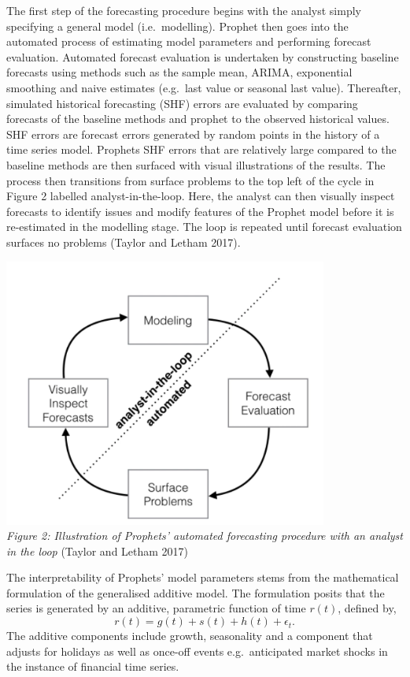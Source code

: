 \documentclass[12pt,a4paper]{article}
\numberwithin{equation}{section}
\numberwithin{figure}{section}
\numberwithin{table}{section}
\begin{document}
The first step of the forecasting procedure begins with the analyst
simply specifying a general model (i.e.~modelling). Prophet then goes
into the automated process of estimating model parameters and performing
forecast evaluation. Automated forecast evaluation is undertaken by
constructing baseline forecasts using methods such as the sample mean,
ARIMA, exponential smoothing and naive estimates (e.g.~last value or
seasonal last value). Thereafter, simulated historical forecasting (SHF)
errors are evaluated by comparing forecasts of the baseline methods and
prophet to the observed historical values. SHF errors are forecast
errors generated by random points in the history of a time series model.
Prophets SHF errors that are relatively large compared to the baseline
methods are then surfaced with visual illustrations of the results. The
process then transitions from surface problems to the top left of the
cycle in Figure 2 labelled analyst-in-the-loop. Here, the analyst can
then visually inspect forecasts to identify issues and modify features
of the Prophet model before it is re-estimated in the modelling stage.
The loop is repeated until forecast evaluation surfaces no problems
(Taylor and Letham 2017).

\includegraphics[width=0.80000\textwidth]{analyst in the loop.png}\\
\emph{Figure 2: Illustration of Prophets' automated forecasting
procedure with an analyst in the loop} (Taylor and Letham 2017)

The interpretability of Prophets' model parameters stems from the
mathematical formulation of the generalised additive model. The
formulation posits that the series is generated by an additive,
parametric function of time \(r(t)\), defined by,
\[ r(t) = g(t) + s(t) +  h(t) + \epsilon_t.\] The additive components
include growth, seasonality and a component that adjusts for holidays as
well as once-off events e.g.~anticipated market shocks in the instance
of financial time series.
\end{document}
